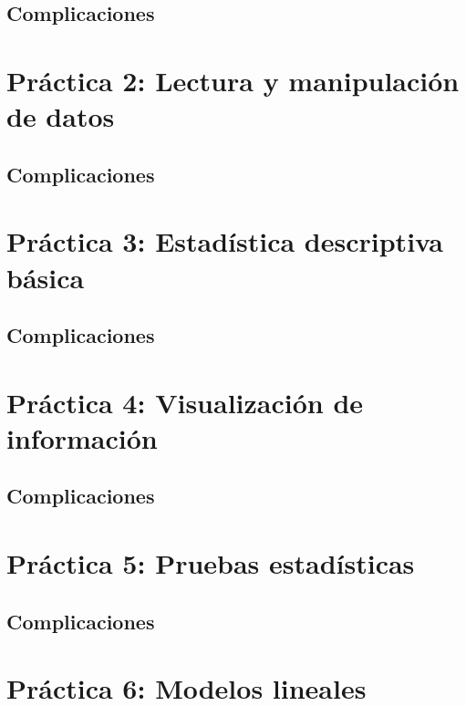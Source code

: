 \documentclass[12pt, letter]{report}
\begin{document}
\section*{Complicaciones}



\chapter*{Práctica 2: Lectura y manipulación de datos}
\section*{Complicaciones}



\chapter*{Práctica 3: Estadística descriptiva básica}
\section*{Complicaciones}



\chapter*{Práctica 4: Visualización de información}
\section*{Complicaciones}



\chapter*{Práctica 5: Pruebas estadísticas}
\section*{Complicaciones}



\chapter*{Práctica 6: Modelos lineales}
\end{document}
